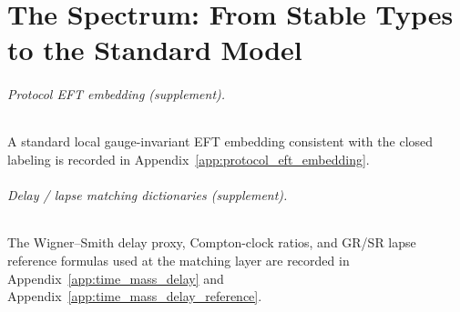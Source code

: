 \part{The Spectrum: From Stable Types to the Standard Model}




\paragraph{Protocol EFT embedding (supplement).}
\InterfaceTag A standard local gauge-invariant EFT embedding consistent with the closed labeling is recorded in Appendix~\ref{app:protocol_eft_embedding}.




\paragraph{Delay / lapse matching dictionaries (supplement).}
\MatchTag The Wigner--Smith delay proxy, Compton-clock ratios, and GR/SR lapse reference formulas used at the matching layer are recorded in Appendix~\ref{app:time_mass_delay} and Appendix~\ref{app:time_mass_delay_reference}.


